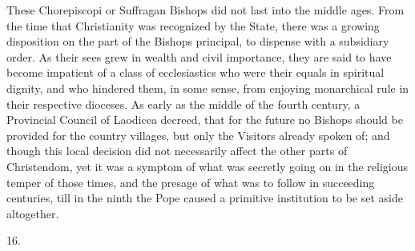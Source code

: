 These Chorepiscopi or Suffragan Bishops did not
last into the middle ages. From the time that Christianity was
recognized by the State, there was a growing disposition on the part
of the Bishops principal, to dispense with a subsidiary order. As
their sees grew in wealth and civil importance, they are said to have
become impatient of a class of ecclesiastics who were their equals in
spiritual dignity, and who hindered them, in some sense, from enjoying
monarchical rule in their respective dioceses. As early as the middle
of the fourth century, a Provincial Council of Laodicea decreed, that
for the future no Bishops should be provided for the country villages,
but only the Visitors already spoken of; and though this local
decision did not necessarily affect the other parts of Christendom,
yet it was a symptom of what was secretly going on in the religious
temper of those times, and the presage of what was to follow in
succeeding centuries, till in the ninth the Pope caused a primitive
institution to be set aside altogether.

16.

